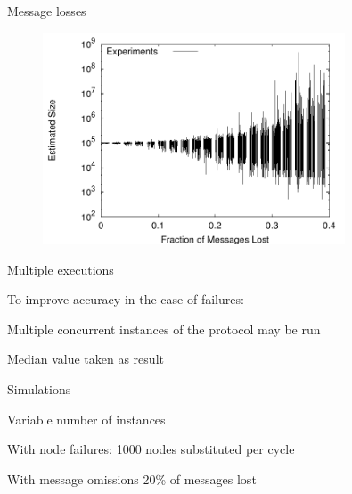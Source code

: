\begin{frame}{Message losses}

\begin{figure}
\includegraphics[width=0.80\textwidth]{figs/11/newscast-fail-asym}
\end{figure}

		
\end{frame}

\begin{frame}{Multiple executions}

\BIL
\item To improve accuracy in the case of failures:
	\BI
	\item Multiple concurrent instances of the protocol may be run
	\item Median value taken as result
	\EI
\item Simulations
	\BI
	\item Variable number of instances
	\item With node failures: 1000 nodes substituted per cycle
	\item With message omissions 20\% of messages lost
	\EI
\EIL
	
\end{frame}


